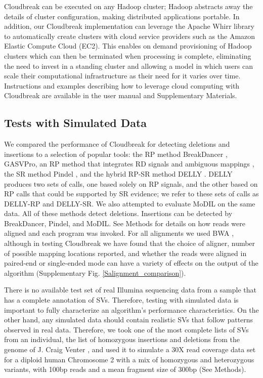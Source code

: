 \documentclass[11pt]{article}
\begin{document}
Cloudbreak can be executed on any Hadoop cluster; Hadoop abstracts away the details of cluster configuration, making distributed applications portable. In addition, our Cloudbreak implementation can leverage the Apache Whirr library to automatically create clusters with cloud service providers such as the Amazon Elastic Compute Cloud (EC2). This enables on demand provisioning of Hadoop clusters which can then be terminated when processing is complete, eliminating the need to invest in a standing cluster and allowing a model in which users can scale their computational infrastructure as their need for it varies over time. Instructions and examples describing how to leverage cloud computing with Cloudbreak are available in the user manual and Supplementary Materials.

\subsection{Tests with Simulated Data}

We compared the performance of Cloudbreak for detecting deletions and insertions to a selection of popular tools: the RP method BreakDancer \autocite{Chen:2009p3}, GASVPro, an RP method that integrates RD signals and ambiguous mappings \autocite{Sindi:2012kk}, the SR method Pindel \autocite{Ye:2009p2}, and the hybrid RP-SR method DELLY \autocite{Rausch:2012he}. DELLY produces two sets of calls, one based solely on RP signals, and the other based on RP calls that could be supported by SR evidence; we refer to these sets of calls as DELLY-RP and DELLY-SR. We also attempted to evaluate MoDIL on the same data. All of these methods detect deletions. Insertions can be detected by BreakDancer, Pindel, and MoDIL. See Methods for details on how reads were aligned and each program was invoked. For all alignments we used BWA \autocite{Li:2009p836}, although in testing Cloudbreak we have found that the choice of aligner, number of possible mapping locations reported, and whether the reads were aligned in paired-end or single-ended mode can have a variety of effects on the output of the algorithm (Supplementary Fig. \ref{Salignment_comparison}).

There is no available test set of real Illumina sequencing data from a sample that has a complete annotation of SVs. Therefore, testing with simulated data is important to fully characterize an algorithm's performance characteristics. On the other hand, any simulated data should contain realistic SVs that follow patterns observed in real data. Therefore, we took one of the most complete lists of SVs from an individual, the list of homozygous insertions and deletions from the genome of J. Craig Venter \autocite{Levy:2007fb}, and used it to simulate a 30X read coverage data set for a diploid human Chromosome 2 with a mix of homozygous and heterozygous variants, with 100bp reads and a mean fragment size of 300bp (See Methods).
\end{document}
